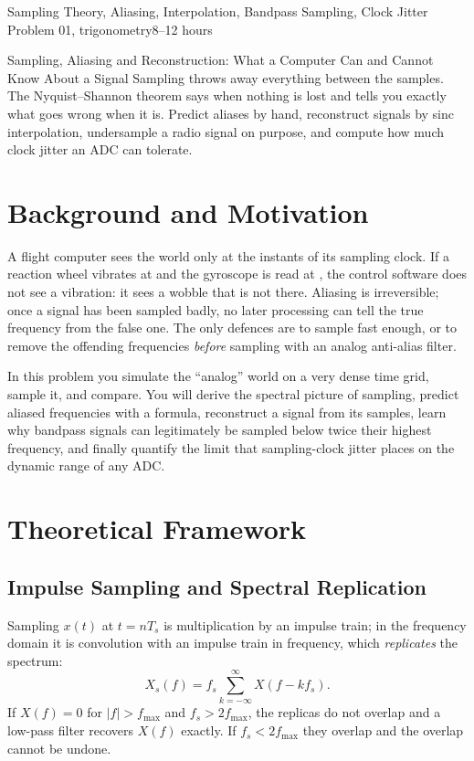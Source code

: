 \documentclass[11pt,a4paper]{article}
\begin{document}
%
{Sampling Theory, Aliasing, Interpolation, Bandpass Sampling, Clock Jitter}%
{Problem 01, trigonometry}{8--12 hours}

\begin{summarybox}{Sampling, Aliasing and Reconstruction: What a Computer Can and Cannot Know About a Signal}
Sampling throws away everything between the samples. The Nyquist--Shannon theorem says when nothing is lost and tells you exactly what goes wrong when it is. Predict aliases by hand, reconstruct signals by sinc interpolation, undersample a radio signal on purpose, and compute how much clock jitter an ADC can tolerate.
\end{summarybox}


\section*{Background and Motivation}
A flight computer sees the world only at the instants of its sampling clock. If a reaction wheel vibrates at  and the gyroscope is read at , the control software does not see a  vibration: it sees a  wobble that is not there. Aliasing is irreversible; once a signal has been sampled badly, no later processing can tell the true frequency from the false one. The only defences are to sample fast enough, or to remove the offending frequencies \emph{before} sampling with an analog anti-alias filter.

In this problem you simulate the ``analog'' world on a very dense time grid, sample it, and compare. You will derive the spectral picture of sampling, predict aliased frequencies with a formula, reconstruct a signal from its samples, learn why bandpass signals can legitimately be sampled below twice their highest frequency, and finally quantify the limit that sampling-clock jitter places on the dynamic range of any ADC.

\section*{Theoretical Framework}
\subsection{Impulse Sampling and Spectral Replication}
Sampling $x(t)$ at $t=nT_s$ is multiplication by an impulse train; in the frequency domain it is convolution with an impulse train in frequency, which \emph{replicates} the spectrum:
\begin{equation}
  X_s(f)=f_s\sum_{k=-\infty}^{\infty}X(f-kf_s).
  \label{eq:replica}
\end{equation}
If $X(f)=0$ for $|f|>f_{\max}$ and $f_s>2f_{\max}$, the replicas do not overlap and a low-pass filter recovers $X(f)$ exactly. If $f_s<2f_{\max}$ they overlap and the overlap cannot be undone.
\end{document}
